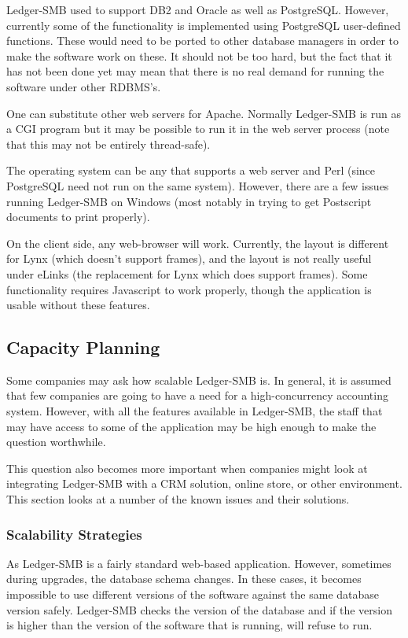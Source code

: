 \documentclass{article}
\begin{document}
Ledger-SMB used to support DB2 and Oracle as well as PostgreSQL.  However,
currently some of the functionality is implemented using PostgreSQL user-defined
functions.  These would need to be ported to other database managers in order to
make the software work on these.  It should not be too hard, but the fact that
it has not been done yet may mean that there is no real demand for running the
software under other RDBMS's.

One can substitute other web servers for Apache.  Normally Ledger-SMB is run as
a CGI program but it may be possible to run it in the web server process (note
that this may not be entirely thread-safe).

The operating system can be any that supports a web server and Perl (since
PostgreSQL need not run on the same system).   However, there are a few issues
running Ledger-SMB on Windows (most notably in trying to get Postscript
documents to print properly).

On the client side, any web-browser will work.  Currently, the layout is
different for Lynx (which doesn't support frames), and the layout is not really
useful under eLinks (the replacement for Lynx which does support frames).  Some
functionality requires Javascript to work properly, though the application is
usable without these features.

\subsection{Capacity Planning}
Some companies may ask how scalable Ledger-SMB is.  In general, it is assumed
that few companies are going to have a need for a high-concurrency accounting
system.  However, with all the features available in Ledger-SMB, the staff that
may have access to some of the application may be high enough to make the
question worthwhile.

This question also becomes more important when companies might look at
integrating Ledger-SMB with a CRM solution, online store, or other environment.
This section looks at a number of the known issues and their solutions.

\subsubsection{Scalability Strategies}
As Ledger-SMB is a fairly standard web-based application.  However, sometimes
during upgrades, the database schema changes.  In these cases, it becomes
impossible to use different versions of the software against the same database
version safely.  Ledger-SMB checks the version of the database and if the
version is higher than the version of the software that is running, will refuse
to run.
\end{document}
